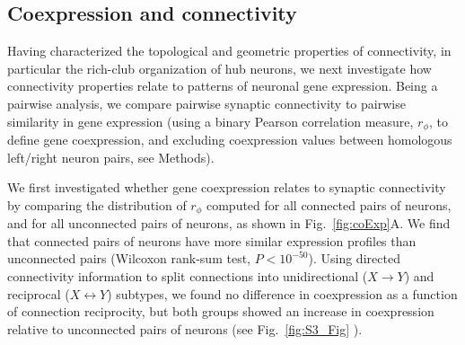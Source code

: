 \documentclass[10pt,letterpaper]{article}
\begin{document}
\subsection*{Coexpression and connectivity}

Having characterized the topological and geometric properties of connectivity, in particular the rich-club organization of hub neurons, we next investigate how connectivity properties relate to patterns of neuronal gene expression.
Being a pairwise analysis, we compare pairwise synaptic connectivity to pairwise similarity in gene expression (using a binary Pearson correlation measure, $r_\phi$, to define gene coexpression, and excluding coexpression values between homologous left/right neuron pairs, see Methods).

We first investigated whether gene coexpression relates to synaptic connectivity by comparing the distribution of $r_\phi$ computed for all connected pairs of neurons, and for all unconnected pairs of neurons, as shown in Fig.~\ref{fig:coExp}A.
We find that connected pairs of neurons have more similar expression profiles than unconnected pairs (Wilcoxon rank-sum test, $P < 10^{-50}$).
Using directed connectivity information to split connections into unidirectional ($X \rightarrow Y$) and reciprocal ($X \leftrightarrow Y$) subtypes, we found no difference in coexpression as a function of connection reciprocity, but both groups showed an increase in coexpression relative to unconnected pairs of neurons (see Fig.~\ref{fig:S3_Fig} ).
\end{document}

